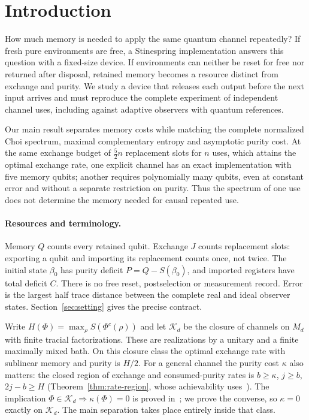 \documentclass[11pt,a4paper]{article}
\theoremstyle{plain}
\theoremstyle{definition}
\theoremstyle{remark}
\begin{document}
\section{Introduction}\label{sec:intro}

How much memory is needed to apply the same quantum channel repeatedly? If
fresh pure environments are free, a Stinespring implementation answers this
question with a fixed-size device. If environments can neither be reset for
free nor returned after disposal, retained memory becomes a resource distinct
from exchange and purity. We study a device that releases each output before
the next input arrives and must reproduce the complete experiment of independent
channel uses, including against adaptive observers with quantum references.

Our main result separates memory costs while matching the complete normalized
Choi spectrum, maximal complementary entropy and asymptotic purity cost. At
the same exchange budget of $\frac52n$ replacement slots for $n$ uses, which
attains the optimal exchange rate, one explicit channel has an exact implementation
with five memory qubits; another requires polynomially many qubits, even at
constant error and without a separate restriction on purity. Thus the spectrum
of one use does not determine the memory needed for causal repeated use.

\paragraph{Resources and terminology.}
Memory $Q$ counts every retained qubit. Exchange $J$ counts replacement slots:
exporting a qubit and importing its replacement counts once, not twice. The
initial state $\beta_0$ has purity deficit $P=Q-S(\beta_0)$, and imported
registers have total deficit $C$. There is no free reset, postselection or
measurement record. Error is the largest half trace distance between the
complete real and ideal observer states. Section~\ref{sec:setting} gives the
precise contract.

Write $H(\Phi)=\max_\rho S(\Phi^c(\rho))$ and let $\mathcal K_d$ be the closure
of channels on $M_d$ with finite tracial factorizations. These are realizations
by a unitary and a finite maximally mixed bath. On this closure class the
optimal exchange rate with sublinear memory and purity is $H/2$. For a general
channel the purity cost $\kappa$ also matters: the closed region of exchange and
consumed-purity rates is $b\ge\kappa$, $j\ge b$, $2j-b\ge H$
(Theorem~\ref{thm:rate-region}, whose achievability uses~\cite[Theorem~2.1]{Douglas2026closed}).
The implication $\Phi\in\mathcal K_d\Rightarrow\kappa(\Phi)=0$ is proved
in~\cite[Section~8]{Douglas2026closed}; we prove the converse, so $\kappa=0$ exactly on
$\mathcal K_d$. The main separation takes place entirely inside that class.
\end{document}
